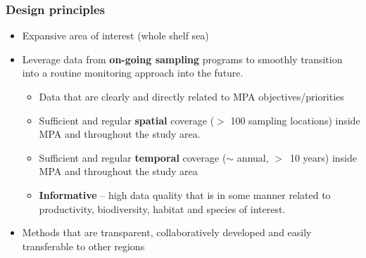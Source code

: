 \documentclass{beamer}
\numberwithin{equation}{section}		%
\numberwithin{figure}{section}		%
\numberwithin{table}{section}				%
\begin{document}
\begin{frame}[shrink]
  \frametitle{Design principles}
  \begin{block}{}
  \begin{itemize}
    \item Expansive area of interest (whole shelf sea)
    \item Leverage data from \textbf{on-going sampling} programs to smoothly transition into a routine monitoring approach into the future.
    \begin{itemize}
      \item Data that are clearly and directly related to MPA objectives/priorities
      \item	Sufficient and regular \textbf{spatial} coverage ($>$ 100 sampling locations) inside MPA and throughout the study area.
      \item Sufficient and regular \textbf{temporal} coverage ($\sim$ annual, $>$~10 years) inside MPA and throughout the study area
      \item \textbf{Informative} -- high data quality that is in some manner related to productivity, biodiversity, habitat and species of interest.
    \end{itemize}
    \item Methods that are transparent, collaboratively developed and easily transferable to other regions

  \end{itemize}
  \end{block}
\end{frame}

\end{document}
